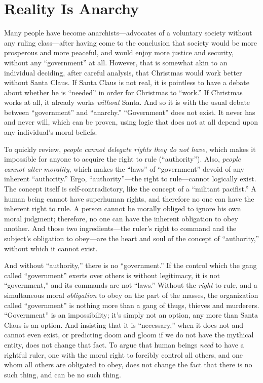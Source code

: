 \documentclass{book}
\begin{document}
\section{Reality Is Anarchy}

Many people have become anarchists---advocates of a voluntary society without any ruling class---after having come to the conclusion that society would be more prosperous and more peaceful, and would enjoy more justice and security, without any \enquote{government} at all. However, that is somewhat akin to an individual deciding, after careful analysis, that Christmas would work better without Santa Claus. If Santa Claus is not real, it is pointless to have a debate about whether he is \enquote{needed} in order for Christmas to \enquote{work.} If Christmas works at all, it already works \emph{without} Santa. And so it is with the usual debate between \enquote{government} and \enquote{anarchy.} \enquote{Government} does not exist. It never has and never will, which can be proven, using logic that does not at all depend upon any individual's moral beliefs.

To quickly review, \emph{people cannot delegate rights they do not have}, which makes it impossible for anyone to acquire the right to rule (\enquote{authority}). Also, \emph{people cannot alter morality}, which makes the \enquote{laws} of \enquote{government} devoid of any inherent \enquote{authority.} Ergo, \enquote{authority}---the right to rule---cannot logically exist. The concept itself is self-contradictory, like the concept of a \enquote{militant pacifist.} A human being cannot have superhuman rights, and therefore no one can have the inherent right to rule. A person cannot be morally obliged to ignore his own moral judgment; therefore, no one can have the inherent obligation to obey another. And those two ingredients---the ruler's right to command and the subject's obligation to obey---are the heart and soul of the concept of \enquote{authority,} without which it cannot exist.

And without \enquote{authority,} there is no \enquote{government.} If the control which the gang called \enquote{government} exerts over others is without legitimacy, it is not \enquote{government,} and its commands are not \enquote{laws.} Without the \emph{right} to rule, and a simultaneous moral \emph{obligation} to obey on the part of the masses, the organization called \enquote{government} is nothing more than a gang of thugs, thieves and murderers. \enquote{Government} is an impossibility; it's simply not an option, any more than Santa Claus is an option. And insisting that it is \enquote{necessary,} when it does not and cannot even exist, or predicting doom and gloom if we do not have the mythical entity, does not change that fact. To argue that human beings \emph{need} to have a rightful ruler, one with the moral right to forcibly control all others, and one whom all others are obligated to obey, does not change the fact that there is no such thing, and can be no such thing.
\end{document}
